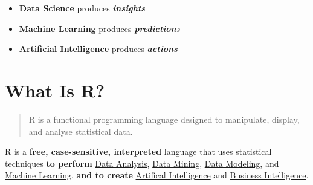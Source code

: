 \documentclass[]{book}
\providecommand{\tightlist}{%
  \setlength{\itemsep}{0pt}\setlength{\parskip}{0pt}}
\theoremstyle{definition}
\theoremstyle{definition}
\theoremstyle{definition}
\theoremstyle{remark}
\begin{document}
\begin{itemize}
\tightlist
\item
  \textbf{Data Science} produces \emph{\textbf{insights}}
\item
  \textbf{Machine Learning} produces \emph{\textbf{prediction}s}
\item
  \textbf{Artificial Intelligence} produces \emph{\textbf{actions}}
\end{itemize}

\hypertarget{what-is-r}{%
\section{What Is R?}\label{what-is-r}}

\begin{quote}
R is a functional programming language designed to manipulate, display,
and analyse statistical data.
\end{quote}

R is a \textbf{free, case-sensitive, interpreted} language that uses
statistical techniques \textbf{to perform}
\href{https://en.wikipedia.org/wiki/Data_analysis}{Data Analysis},
\href{https://en.wikipedia.org/wiki/Data_mining}{Data Mining},
\href{https://en.wikipedia.org/wiki/Data_modeling}{Data Modeling}, and
\href{https://en.wikipedia.org/wiki/Machine_learning}{Machine Learning},
\textbf{and to create}
\href{https://www.innoarchitech.com/python-vs-or-r-artificial-intelligence-ai-machine-learning-data-science-which-use/}{Artifical
Intelligence} and
\href{https://en.wikipedia.org/wiki/Business_intelligence}{Business
Intelligence}.
\end{document}
